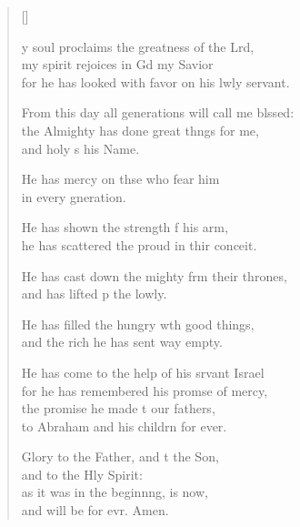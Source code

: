 \settowidth{\versewidth}{From this day all generations will call me blessed: +}
\begin{verse}[\versewidth]
  \begin{patverse}
y soul proclaims the greatness of the Lrd,\Flex\\
my spirit rejoices in Gd my Savior\Med\\
for he has looked with favor on his lwly servant.

From this day all generations will call me blssed:\Flex\\
the Almighty has done great th\pointup{\i}ngs for me,\Med\\
and holy \pointup{\i}s his Name.

He has mercy on thse who fear him\Med\\
in every gneration.

He has shown the strength f his arm,\Med\\
he has scattered the proud in thir conceit.

He has cast down the mighty frm their thrones,\Med\\
and has lifted p the lowly.

He has filled the hungry w\pointup{\i}th good things,\Med\\
and the rich he has sent way empty.

He has come to the help of his srvant Israel\Med\\
for he has remembered his prom\pointup{\i}se of mercy,\\
the promise he made t our fathers,\Med\\
to Abraham and his childrn for ever.

Glory to the Father, and t the Son,\Med\\
and to the Hly Spirit:\\
as it was in the beginn\pointup{\i}ng, is now,\Med\\
and will be for evr. Amen.
  \end{patverse}
\end{verse}
